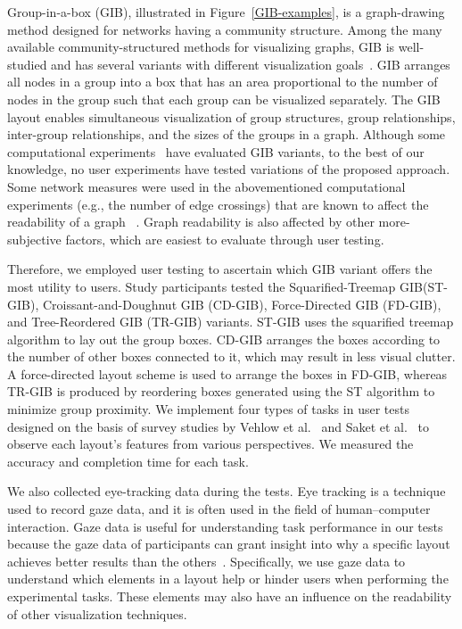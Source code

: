 \documentclass{vgtc}                          %
\begin{document}
Group-in-a-box (GIB), illustrated in Figure~\ref{GIB-examples}, is a graph-drawing method designed for networks having a community structure.
Among the many available community-structured methods for visualizing graphs, GIB is well-studied and has several variants with different visualization goals~\cite{rodrigues2011group,chaturvedi2014group,onoue2017optimal}.
GIB arranges all nodes in a group into a box that has an area proportional to the number of nodes in the group such that each group can be visualized separately.
The GIB layout enables simultaneous visualization of group structures, group relationships, inter-group relationships, and the sizes of the groups in a graph.
Although some computational experiments~\cite{chaturvedi2014group,onoue2017optimal} have evaluated GIB variants, to the best of our knowledge, no user experiments have tested variations of the proposed approach.
Some network measures were used in the abovementioned computational experiments (e.g., the number of edge crossings) that are known to affect the readability of a graph ~\cite{468391,purchase1997aesthetic,purchase1998performance,purchase2002empirical}. Graph readability is also affected by other more-subjective factors, which are easiest to evaluate through user testing.

Therefore, we employed user testing to ascertain which GIB variant offers the most utility to users.
Study participants tested the Squarified-Treemap GIB(ST-GIB), Croissant-and-Doughnut GIB (CD-GIB), Force-Directed GIB (FD-GIB), and Tree-Reordered GIB (TR-GIB) variants.
ST-GIB uses the squarified treemap algorithm \cite{bruls2000squarified} to lay out the group boxes.
CD-GIB arranges the boxes according to the number of other boxes connected to it, which may result in less visual clutter.
A force-directed layout scheme is used to arrange the boxes in FD-GIB, whereas TR-GIB is produced by reordering boxes generated using the ST algorithm to minimize group proximity.
We implement four types of tasks in user tests designed on the basis of survey studies by Vehlow et al.~\cite{Vehlow2017VisualizingGS} and Saket et al.~\cite{saket2014group} to observe each layout's features from various perspectives.
We measured the accuracy and completion time for each task.

We also collected eye-tracking data during the tests.
Eye tracking is a technique used to record gaze data, and it is often used in the field of human--computer interaction.
Gaze data is useful for understanding task performance in our tests because the gaze data of participants can grant insight into why a specific layout achieves better results than the others~\cite{andrienko2012visual,duchowski2007eye,kurzhals2014evaluating}.
Specifically, we use gaze data to understand which elements in a layout help or hinder users when performing the experimental tasks.
These elements may also have an influence on the readability of other visualization techniques.
\end{document}
